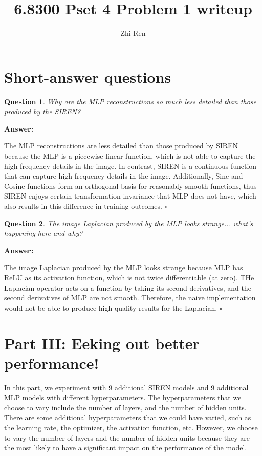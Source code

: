 \documentclass[12pt]{article}
\newtheorem{question}{Question}
\newenvironment{answer}{%
  \par\noindent\textbf{Answer:}\quad
}{%
  \hfill$\square$\par
}
\begin{document}
 
%
%
 
\title{6.8300 Pset 4 Problem 1 writeup} %
\author{Zhi Ren} %
\maketitle

\section{Short-answer questions}
\begin{question}
Why are the MLP reconstructions so much less detailed than those produced by the SIREN?
\end{question}
\begin{answer}
The MLP reconstructions are less detailed than those produced by SIREN because the MLP is a piecewise linear function, which is not able to capture the high-frequency details in the image. In contrast, SIREN is a continuous function that can capture high-frequency details in the image. Additionally, Sine and Cosine functions form an orthogonal basis for reasonably smooth functions, thus SIREN enjoys certain transformation-invariance that MLP does not have, which also results in this difference in training outcomes. 
\end{answer}

\begin{question}
The image Laplacian produced by the MLP looks strange... what's happening here and why?
\end{question}
\begin{answer}
    The image Laplacian produced by the MLP looks strange because MLP has ReLU as its activation function, which is not twice differentiable (at zero). THe Laplacian operator acts on a function by taking its second derivatives, and the second derivatives of MLP are not smooth. Therefore, the naive implementation would not be able to produce high quality results for the Laplacian. 
\end{answer}


\section{Part III: Eeking out better performance!}
In this part, we experiment with 9 additional SIREN models and 9 additional MLP models with different hyperparameters. The hyperparameters that we choose to vary include the number of layers, and the number of hidden units. There are some additional hyperparameters that we could have varied, such as the learning rate, the optimizer, the activation function, etc. However, we choose to vary the number of layers and the number of hidden units because they are the most likely to have a significant impact on the performance of the model.
\end{document}

